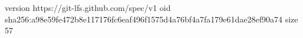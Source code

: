 version https://git-lfs.github.com/spec/v1
oid sha256:a98e59fe472b8e117176fc6eaf496f1575d4a76bf4a7fa179e61dae28ef90a74
size 57
